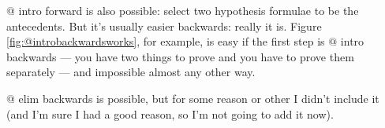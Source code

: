\documentclass[11pt]{book}
\newcommand{\Figref}[1]{Figure \ref{fig:#1}}
\begin{document}
$@$ intro forward is also possible: select two hypothesis formulae to be the antecedents. But it's usually easier backwards: really it is. \Figref{@introbackwardsworks}, for example, is easy if the first step is $@$ intro backwards --- you have two things to prove and you have to prove them separately --- and impossible almost any other way.

$@$ elim backwards is possible, but for some reason or other I didn't include it (and I'm sure I had a good reason, so I'm not going to add it now).

\begin{figure}
\centering
{}
\qquad
{}

\end{figure}
\end{document}
